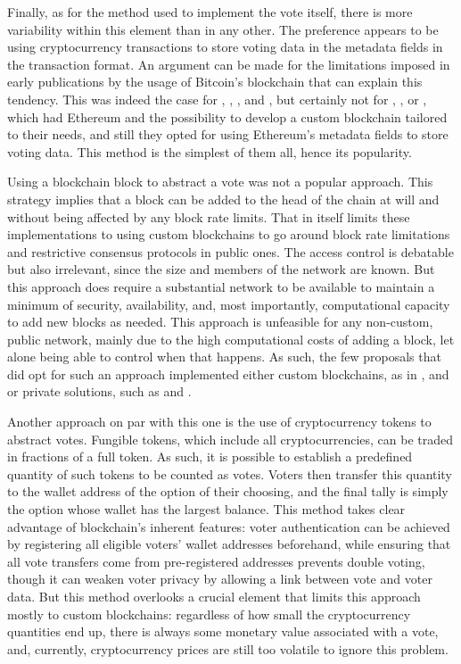\documentclass[../access.tex]{subfiles}
\begin{document}
\par
Finally, as for the method used to implement the vote itself, there is more variability within this element than in any other. The preference appears to be using cryptocurrency transactions to store voting data in the metadata fields in the transaction format. An argument can be made for the limitations imposed in early publications by the usage of Bitcoin's blockchain that can explain this tendency. This was indeed the case for \cite{Zhao2016}, \cite{Cruz2016}, \cite{Bistarelli2017}, \cite{Lee2017} and \cite{Bartolucci2018}, but certainly not for \cite{Hardwick2018}, \cite{Wang2018}, \cite{Lai2018} or \cite{Bosri2019}, which had Ethereum and the possibility to develop a custom blockchain tailored to their needs, and still they opted for using Ethereum's metadata fields to store voting data. This method is the simplest of them all, hence its popularity.
\par
Using a blockchain block to abstract a vote was not a popular approach. This strategy implies that a block can be added to the head of the chain at will and without being affected by any block rate limits. That in itself limits these implementations to using custom blockchains to go around block rate limitations and restrictive consensus protocols in public ones. The access control is debatable but also irrelevant, since the size and members of the network are known. But this approach does require a substantial network to be available to maintain a minimum of security, availability, and, most importantly, computational capacity to add new blocks as needed. This approach is unfeasible for any non-custom, public network, mainly due to the high computational costs of adding a block, let alone being able to control when that happens. As such, the few proposals that did opt for such an approach implemented either custom blockchains, as in \cite{BenAyed2017}, \cite{Khan2018} and \cite{Yi2019} or private solutions, such as \cite{Singh2019} and \cite{Adiputra2019}.
\par
Another approach on par with this one is the use of cryptocurrency tokens to abstract votes. Fungible tokens, which include all cryptocurrencies, can be traded in fractions of a full token. As such, it is possible to establish a predefined quantity of such tokens to be counted as votes. Voters then transfer this quantity to the wallet address of the option of their choosing, and the final tally is simply the option whose wallet has the largest balance. This method takes clear advantage of blockchain's inherent features: voter authentication can be achieved by registering all eligible voters' wallet addresses beforehand, while ensuring that all vote transfers come from pre-registered addresses prevents double voting, though it can weaken voter privacy by allowing a link between vote and voter data. But this method overlooks a crucial element that limits this approach mostly to custom blockchains: regardless of how small the cryptocurrency quantities end up, there is always some monetary value associated with a vote, and, currently, cryptocurrency prices are still too volatile to ignore this problem.
\end{document}
